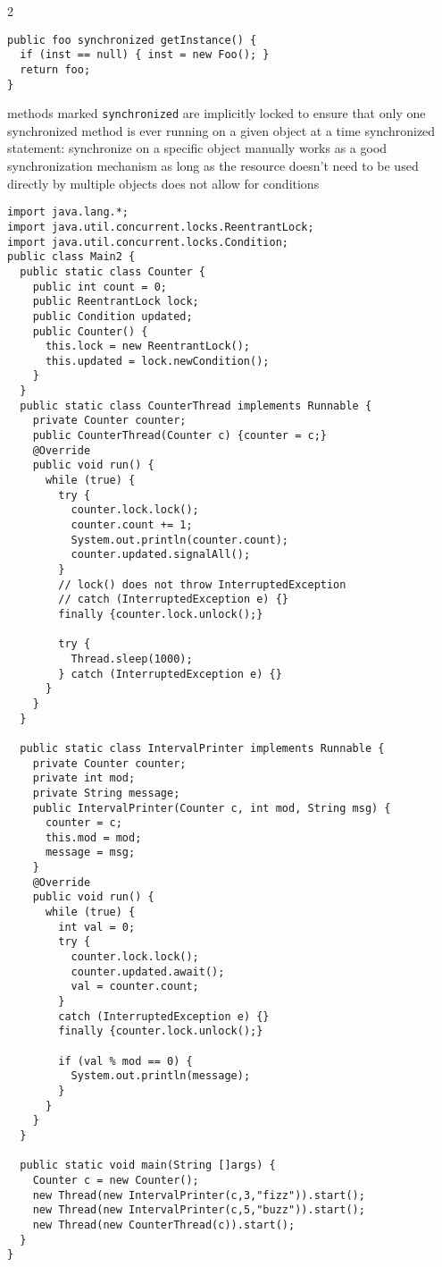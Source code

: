 \documentclass{article}
\def \columncount {2}
\newcommand{\codesize}{8.5}
\newcommand{\java}[1]{{\fontsize{\codesize}{\codesize}\selectfont\texttt{#1}}}
\begin{document}
\begin{multicols*}{\columncount}
\begin{outline}[longenum]
\begin{verbatim}
public foo synchronized getInstance() {
  if (inst == null) { inst = new Foo(); }
  return foo;
}
\end{verbatim}
  \1 methods marked \java{synchronized} are implicitly locked to ensure that only one synchronized method is ever running on a given object at a time
  \1 synchronized statement: synchronize on a specific object manually
  \1 works as a good synchronization mechanism as long as the resource doesn't need to be used directly by multiple objects
  \1 does not allow for conditions
\0
\begin{verbatim}
import java.lang.*;
import java.util.concurrent.locks.ReentrantLock;
import java.util.concurrent.locks.Condition;
public class Main2 {
  public static class Counter {
    public int count = 0;
    public ReentrantLock lock;
    public Condition updated;
    public Counter() {
      this.lock = new ReentrantLock();
      this.updated = lock.newCondition();
    }
  }
  public static class CounterThread implements Runnable {
    private Counter counter;
    public CounterThread(Counter c) {counter = c;}
    @Override
    public void run() {
      while (true) {
        try {
          counter.lock.lock();
          counter.count += 1;
          System.out.println(counter.count);
          counter.updated.signalAll();
        } 
        // lock() does not throw InterruptedException
        // catch (InterruptedException e) {}
        finally {counter.lock.unlock();}
        
        try {
          Thread.sleep(1000);
        } catch (InterruptedException e) {}
      }
    }
  }

  public static class IntervalPrinter implements Runnable {
    private Counter counter;
    private int mod;
    private String message;
    public IntervalPrinter(Counter c, int mod, String msg) {
      counter = c;
      this.mod = mod;
      message = msg;
    }
    @Override
    public void run() {
      while (true) {
        int val = 0;
        try {
          counter.lock.lock();
          counter.updated.await();
          val = counter.count;
        } 
        catch (InterruptedException e) {}
        finally {counter.lock.unlock();}

        if (val % mod == 0) {
          System.out.println(message);
        }
      }
    }
  }

  public static void main(String []args) {
    Counter c = new Counter();
    new Thread(new IntervalPrinter(c,3,"fizz")).start();
    new Thread(new IntervalPrinter(c,5,"buzz")).start();
    new Thread(new CounterThread(c)).start();
  }
}
\end{verbatim}



\end{outline}
\end{multicols*}
\end{document}
